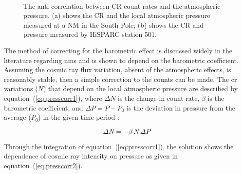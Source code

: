 \begin{figure}[ht]
	\centering
	 \\
	
	\caption{The anti-correlation between CR count rates and the atmospheric pressure. (a) shows the CR and the local atmospheric pressure measured at a NM in the South Pole; (b) shows the CR and pressure measured by HiSPARC station 501.}
	\label{fig:CR_V_P}
\end{figure}


The method of correcting for the barometric effect is discussed widely in the literature regarding \glspl{nm} and is shown to depend on the barometric coefficient. Assuming the cosmic ray flux variation, absent of the atmospheric effects, is reasonably stable, then a simple correction to the counts can be made. The \gls{cr} variations ($N$) that depend on the local atmospheric pressure are described by equation~(\ref{eq:presscorr1}), where $\Delta N$ is the change in count rate, $\beta$ is the barometric coefficient, and $\Delta P = P - P_0$ is the deviation in pressure from the average ($P_0$) in the given time-period \citep{paschalis_online_2013}:

\begin{equation}
\Delta N = - \beta \, N \, \Delta P
\label{eq:presscorr1}
\end{equation}

Through the integration of equation~(\ref{eq:presscorr1}), the solution shows the dependence of cosmic ray intensity on pressure as given in equation~(\ref{eq:presscorr2}). 


